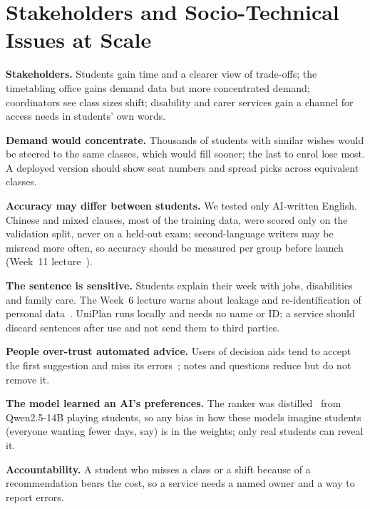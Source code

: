 \section{Stakeholders and Socio-Technical Issues at Scale}\label{sec:socio}

\textbf{Stakeholders.} Students gain time and a clearer view of trade-offs; the timetabling office gains demand data but more concentrated demand; coordinators see class sizes shift; disability and carer services gain a channel for access needs in students' own words.

\textbf{Demand would concentrate.} Thousands of students with similar wishes would be steered to the same classes, which would fill sooner; the last to enrol lose most. A deployed version should show seat numbers and spread picks across equivalent classes.

\textbf{Accuracy may differ between students.} We tested only AI-written English. Chinese and mixed clauses, most of the training data, were scored only on the validation split, never on a held-out exam; second-language writers may be misread more often, so accuracy should be measured per group before launch (Week~11 lecture~\cite{engg2112_w11}).

\textbf{The sentence is sensitive.} Students explain their week with jobs, disabilities and family care. The Week~6 lecture warns about leakage and re-identification of personal data~\cite{engg2112_w06}. UniPlan runs locally and needs no name or ID; a service should discard sentences after use and not send them to third parties.

\textbf{People over-trust automated advice.} Users of decision aids tend to accept the first suggestion and miss its errors~\cite{parasuraman2010}; notes and questions reduce but do not remove it.

\textbf{The model learned an AI's preferences.} The ranker was distilled~\cite{hinton2015distill} from Qwen2.5-14B playing students, so any bias in how these models imagine students (everyone wanting fewer days, say) is in the weights; only real students can reveal it.

\textbf{Accountability.} A student who misses a class or a shift because of a recommendation bears the cost, so a service needs a named owner and a way to report errors.
